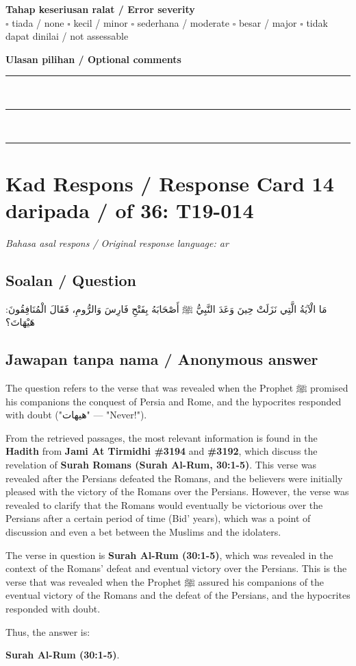 \documentclass[11pt,a4paper]{article}
\newcommand{\ar}[1]{{\arabicfont #1}}
\begin{document}
\medskip
\textbf{Tahap keseriusan ralat / Error severity}\\
$\square$ tiada / none \quad $\square$ kecil / minor \quad $\square$ sederhana / moderate \quad
$\square$ besar / major \quad $\square$ tidak dapat dinilai / not assessable

\medskip
\textbf{Ulasan pilihan / Optional comments}\\[3pt]
\rule{\textwidth}{0.4pt}\\[16pt]
\rule{\textwidth}{0.4pt}\\[16pt]
\rule{\textwidth}{0.4pt}

\newpage
\section*{Kad Respons / Response Card 14 daripada / of 36: T19-014}
\textit{Bahasa asal respons / Original response language: ar}

\subsection*{Soalan / Question}
\ar{مَا} \ar{الْآيَةُ} \ar{الَّتِي} \ar{نَزَلَتْ} \ar{حِينَ} \ar{وَعَدَ} \ar{النَّبِيُّ} \ar{ﷺ} \ar{أَصْحَابَهُ} \ar{بِفَتْحِ} \ar{فَارِسَ} \ar{وَالرُّومِ،} \ar{فَقَالَ} \ar{الْمُنَافِقُونَ}: \ar{هَيْهَاتَ؟}

\subsection*{Jawapan tanpa nama / Anonymous answer}
The question refers to the verse that was revealed when the Prophet \ar{ﷺ} promised his companions the conquest of Persia and Rome, and the hypocrites responded with doubt ("\ar{هيهات}" — "Never!").\par\medskip From the retrieved passages, the most relevant information is found in the \textbf{Hadith} from \textbf{Jami At Tirmidhi \#3194} and \textbf{\#3192}, which discuss the revelation of \textbf{Surah Romans (Surah Al-Rum, 30:1-5)}. This verse was revealed after the Persians defeated the Romans, and the believers were initially pleased with the victory of the Romans over the Persians. However, the verse was revealed to clarify that the Romans would eventually be victorious over the Persians after a certain period of time (Bid' years), which was a point of discussion and even a bet between the Muslims and the idolaters.\par\medskip The verse in question is \textbf{Surah Al-Rum (30:1-5)}, which was revealed in the context of the Romans' defeat and eventual victory over the Persians. This is the verse that was revealed when the Prophet \ar{ﷺ} assured his companions of the eventual victory of the Romans and the defeat of the Persians, and the hypocrites responded with doubt.\par\medskip Thus, the answer is:\par\medskip \textbf{Surah Al-Rum (30:1-5)}.
\end{document}
